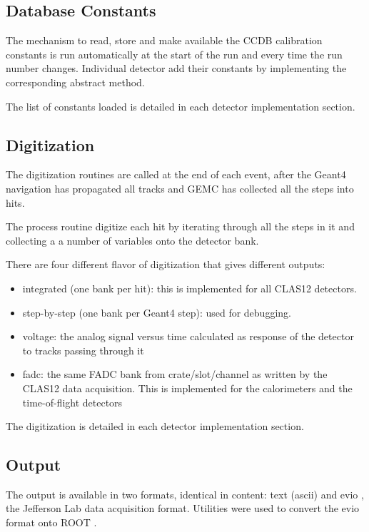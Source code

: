 \subsection{Database Constants}

The mechanism to read, store and make available the CCDB \cite{ccdb} calibration constants is
run automatically at the start of the run and every time the run number changes.
Individual detector add their constants by implementing the corresponding abstract method.

The list of constants loaded is detailed in each detector implementation section.

\subsection{Digitization}

The digitization routines are called at the end of each event, after the Geant4 navigation
has propagated all tracks and GEMC has collected all the steps into hits.

The process routine digitize each hit by iterating through all the steps in it and collecting a
a number of variables onto the detector bank.

There are four different flavor of digitization that gives different outputs:

\begin{itemize}
	\item integrated (one bank per hit): this is implemented for all CLAS12 detectors.
	\item step-by-step (one bank per Geant4 step): used for debugging.
	\item voltage: the analog signal versus time calculated as response of the detector to tracks passing through it
    \item fadc: the same FADC bank from crate/slot/channel as written by the CLAS12 data acquisition.
          This is implemented for the calorimeters and the time-of-flight detectors
\end{itemize}


The digitization is detailed in each detector implementation section.


\subsection{Output}

The output is available in two formats, identical in content: text (ascii) and evio \cite{evio}, the Jefferson Lab
data acquisition format.
Utilities were used to convert the evio format onto ROOT \cite{root}.

